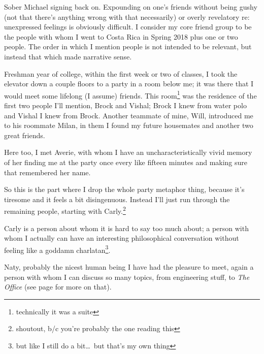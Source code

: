 \documentclass[./butidigress.tex]{subfiles}
\begin{document}
Sober Michael signing back on.
Expounding on one's friends without being gushy (not that there's anything wrong with that necessarily) or overly revelatory re: unexpressed feelings is obviously difficult.
I consider my core friend group to be the people with whom I went to Costa Rica in Spring 2018 plus one or two people.
The order in which I mention people is not intended to be relevant, but instead that which made narrative sense.

Freshman year of college, within the first week or two of classes, I took the elevator down a couple floors to a party in a room below me; it was there that I would meet some lifelong (I assume) friends.
This room\footnote{technically it was a suite} was the residence of the first two people I'll mention, Brock and Vishal; Brock I knew from water polo and Vishal I knew from Brock.%
Another teammate of mine, Will, introduced me to his roommate Milan, in them I found my future housemates and another two great friends.

\vspace{1em}

Here too, I met Averie, with whom I have an uncharacteristically vivid memory of her finding me at the party once every like fifteen minutes and making sure that remembered her name.

So this is the part where I drop the whole party metaphor thing, because it's tiresome and it feels a bit disingenuous.
Instead I'll just run through the remaining people, starting with Carly.\footnote{shoutout, b/c you're probably the one reading this}

Carly is a person about whom it is hard to say too much about; a person with whom I actually can have an interesting philosophical conversation without feeling like a goddamn charlatan\footnote{but like I still do a bit\ldots\ but that's my own thing}.

Naty, probably the nicest human being I have had the pleasure to meet, again a person with whom I can discuss so many topics, from engineering stuff, to \textit{The Office} (see page \pageref{chap:sincerity} for more on that).
\end{document}
